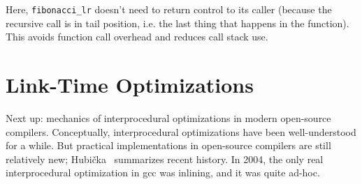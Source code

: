\documentclass[a4paper]{report}
\begin{document}
Here, \texttt{fibonacci\_lr} doesn't need to return control to its caller
(because the recursive call is in tail position, i.e. the last thing that happens
in the function). This avoids
function call overhead and reduces call stack use.

\section*{Link-Time Optimizations}
Next up: mechanics of interprocedural optimizations in modern open-source
compilers. Conceptually, interprocedural optimizations have been well-understood
for a while. But practical implementations in open-source compilers are still
relatively new; Hubi\v{c}ka~\cite{hubicka14:_linkt_gcc} summarizes recent history.
In 2004, the only real interprocedural optimization in gcc was inlining, and it was
quite ad-hoc.
\end{document}
